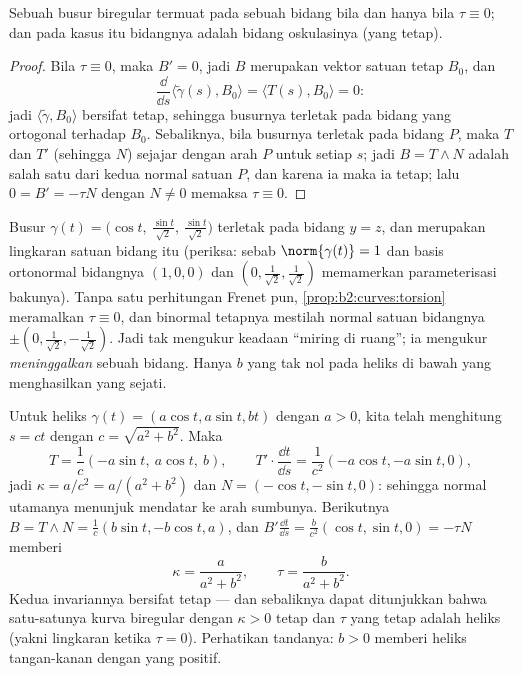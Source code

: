 \begin{proposition}\label{prop:b2:curves:torsion}
Sebuah busur biregular termuat pada sebuah bidang bila dan hanya bila $\tau
\equiv 0$; dan pada kasus itu bidangnya adalah bidang oskulasinya (yang
tetap).
\end{proposition}

\begin{proof}
Bila $\tau \equiv 0$, maka $B' = 0$, jadi $B$ merupakan vektor satuan tetap
$B_0$, dan
\[
\frac{\dd}{\dd s}\langle \tilde\gamma(s), B_0\rangle
= \langle T(s), B_0\rangle = 0 :
\]
jadi $\langle \tilde\gamma, B_0\rangle$ bersifat tetap, sehingga busurnya terletak pada bidang
yang ortogonal terhadap $B_0$. Sebaliknya, bila busurnya terletak pada bidang $P$,
maka $T$ dan $T'$ (sehingga $N$) sejajar dengan arah
$P$ untuk setiap $s$; jadi $B = T \wedge N$ adalah salah satu dari kedua normal
satuan $P$, dan karena ia  maka ia tetap; lalu $0 = B'
= -\tau N$ dengan $N \neq 0$ memaksa $\tau \equiv 0$.
\end{proof}

\begin{example}
Busur $\gamma(t) = \bigl(\cos t,\ \tfrac{\sin t}{\sqrt2},\
\tfrac{\sin t}{\sqrt2}\bigr)$ terletak pada bidang $y = z$, dan
merupakan lingkaran satuan bidang itu (periksa: sebab $\norm{\gamma(t)} =
1$ dan basis ortonormal bidangnya $(1,0,0)$ dan
$(0, \tfrac1{\sqrt2}, \tfrac1{\sqrt2})$ memamerkan parameterisasi
bakunya). Tanpa satu perhitungan Frenet pun,
\cref{prop:b2:curves:torsion} meramalkan $\tau \equiv 0$, dan
binormal tetapnya mestilah normal satuan bidangnya $\pm(0,
\tfrac1{\sqrt2}, -\tfrac1{\sqrt2})$. Jadi  tak mengukur
keadaan ``miring di ruang''; ia mengukur \emph{meninggalkan} sebuah
bidang. Hanya $b$ yang tak nol pada heliks di bawah yang menghasilkan 
yang sejati.
\end{example}

\begin{example}[Heliksnya]\label{ex:b2:curves:helixfrenet}
Untuk heliks $\gamma(t) = (a\cos t, a\sin t, bt)$ dengan $a > 0$, kita telah
menghitung $s = ct$ dengan $c = \sqrt{a^2 + b^2}$. Maka
\[
T = \frac1c(-a\sin t,\ a\cos t,\ b),
\qquad
T' \cdot \frac{\dd t}{\dd s}
= \frac{1}{c^2}(-a\cos t, -a\sin t, 0),
\]
jadi $\kappa = a/c^2 = a/(a^2 + b^2)$ dan $N = (-\cos t, -\sin t,
0)$: sehingga normal utamanya menunjuk mendatar ke arah sumbunya.
Berikutnya $B = T \wedge N = \frac1c(b\sin t, -b\cos t, a)$, dan $B'
\frac{\dd t}{\dd s} = \frac{b}{c^2}(\cos t, \sin t, 0) = -\tau N$
memberi
\[
\boxed{\ \kappa = \frac{a}{a^2 + b^2}, \qquad
\tau = \frac{b}{a^2 + b^2}. \ }
\]
Kedua invariannya bersifat tetap --- dan sebaliknya dapat ditunjukkan bahwa
satu-satunya kurva biregular dengan $\kappa > 0$ tetap dan $\tau$ yang
tetap adalah heliks (yakni lingkaran ketika $\tau = 0$). Perhatikan tandanya: $b >
0$ memberi heliks tangan-kanan dengan \omterm{thm:b2:curves:frenet3d}{torsi} yang positif.
\end{example}

